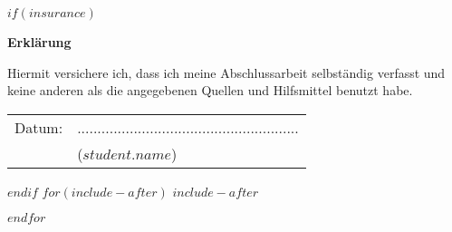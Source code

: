 \documentclass[
    12pt,
    a4paper,
    $if(lang)$
        $babel-lang$,
    $endif$
    bibliography=totocnumbered,
    listof=totocnumbered
]{scrartcl}
\begin{document}
%	


$if(insurance)$
	\newpage
	\thispagestyle{empty}
	\begin{center}
		\vspace*{5em}
		\huge\textbf{Erklärung}\\
	\end{center}
	\vspace{2em}
	Hiermit versichere ich, dass ich meine Abschlussarbeit selbständig verfasst und keine anderen als die angegebenen Quellen und Hilfsmittel benutzt habe.

	\vspace{4em}
	\begin{minipage}{\linewidth}
		\begin{tabular}{p{15em}p{15em}}
			Datum: &  .......................................................\\
			& \centering ($student.name$)\\
		\end{tabular}
	\end{minipage}
$endif$
$for(include-after)$
$include-after$

$endfor$
\end{document}
